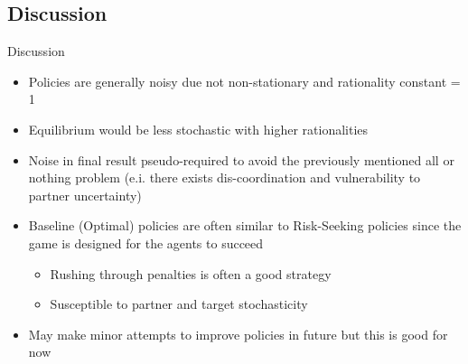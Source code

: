 \documentclass[aspectratio=1610, xcolor=dvipsnames]{packages/beamer}
\begin{document}


\subsection{Discussion}\label{subsec:discussion}\begin{frame}{Discussion}
\begin{itemize}
    \item Policies are generally noisy due not non-stationary and rationality constant = 1
    \item Equilibrium would be less stochastic with higher rationalities
    \item Noise in final result pseudo-required to avoid the previously mentioned all or nothing problem (e.i. there exists dis-coordination and vulnerability to partner uncertainty)
    \item Baseline (Optimal) policies are often similar to Risk-Seeking policies since the game is designed for the agents to succeed
    \begin{itemize}
        \item Rushing through penalties is often a good strategy
        \item Susceptible to partner and target stochasticity
    \end{itemize}
    \item May make minor attempts to improve policies in future but this is good for now
\end{itemize}
\end{frame}
\end{document}
